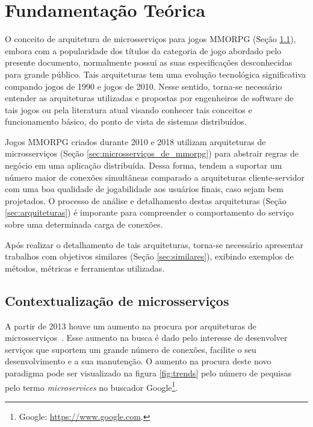 \chapter{Fundamentação Teórica}
\label{cap2}

O conceito de arquitetura de microsserviços para jogos \ac{MMORPG} (Seção \ref{sec:arquitetura_de_microsserviços}), embora com a popularidade dos títulos da categoria de jogo abordado pelo presente documento, normalmente possui as suas especificações desconhecidas para grande público.
%
Tais arquiteturas tem uma evolução tecnológica significativa compando jogos de 1990 e jogos de 2010.
%
Nesse sentido, torna-se necessário entender as arquiteturas utilizadas e propostas por engenheiros de software de tais jogos ou pela literatura atual visando conhecer tais conceitos e funcionamento básico, do ponto de vista de sistemas distribuídos.



Jogos \ac{MMORPG} criados durante 2010 e 2018 utilizam arquiteturas de microsserviços (Seção \ref{sec:microsserviços_de_mmorpg}) para abstrair regras de negócio em uma aplicação distribuída.
%
Dessa forma, tendem a suportar um número maior de conexões simultâneas comparado a arquiteturas cliente-servidor com uma boa qualidade de jogabilidade aos usuários finais, caso sejam bem projetados.
%
O processo de análise e detalhamento destas arquiteturas (Seção \ref{sec:arquiteturas}) é imporante para compreender o comportamento do serviço sobre uma determinada carga de conexões.



Após realizar o detalhamento de tais arquiteturas, torna-se necessário apresentar trabalhos com objetivos similares (Seção \ref{sec:similares}),
%
exibindo exemplos de métodos, métricas e ferramentas utilizadas.



\section{Contextualização de microsserviços}
\label{sec:arquitetura_de_microsserviços}



A partir de 2013 houve um aumento na procura por arquiteturas de microsserviços~\cite{google_trends:2018}.
%
Esse aumento na busca é dado pelo interesse de desenvolver serviços que suportem um grande número de conexões, facilite o seu desenvolvimento e a sua manutenção.
%
O aumento na procura deste novo paradigma pode ser visualizado na figura \ref{fig:trends} pelo número de pequisas pelo termo \textit{microservices} no buscador Google\footnote{Google: \url{https://www.google.com}.}.



